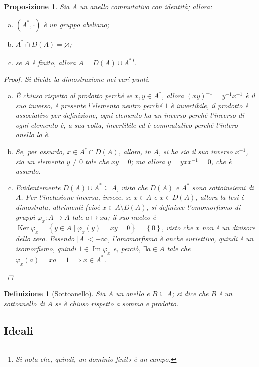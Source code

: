 \documentclass[11pt]{scrartcl}
\theoremstyle{style1}
\newtheorem{prop}{Proposizione}[section]
\newtheorem{definizione}{Definizione}[section]
\numberwithin{equation}{subsection}
\begin{document}
\begin{prop}
	Sia $A $ un anello commutativo con identit\`a; allora:
	\begin{enumerate}[(a).]
		\item $(A^*,\cdot )$ \`e un gruppo abeliano;
		\item $A^* \cap D(A) = \varnothing$;
		\item se $A$ \`e finito, allora $A = D(A) \cup A^*$\footnote{Si nota che, quindi, un dominio finito \`e un campo.}.
	\end{enumerate}
	\begin{proof}Si divide la dimostrazione nei vari punti.
		\begin{enumerate}[(a).]
			\item \`E chiuso rispetto al prodotto perch\'e se $x,y \in A^*$, allora $(xy)^{-1}=y^{-1}x^{-1}$ \`e il suo inverso, \`e presente l'elemento neutro perch\'e $1 $ \`e invertibile, il prodotto \`e associativo per definizione, ogni elemento ha un inverso perch\'e l'inverso di ogni elemento \`e, a sua volta, invertibile ed \`e commutativo perch\'e l'intero anello lo \`e.
			\item Se, per assurdo, $x \in A^* \cap D(A)$, allora, in $A$, si ha sia il suo inverso $x^{-1}$, sia un elemento $y\neq 0$ tale che $xy = 0$; ma allora $y = y x x^{-1} = 0$, che \`e assurdo.
			\item Evidentemente $D(A) \cup A^* \subseteq A$, visto che $D(A)$ e $A^*$ sono sottoinsiemi di $A$.
				Per l'inclusione inversa, invece, se $x \in A$ e $x \in D(A)$, allora la tesi \`e dimostrata, altrimenti (cio\`e $x \in A \setminus D(A)$, si definisce l'omomorfismo di gruppi $\varphi _x : A \to A$ tale $a\longmapsto xa$; il suo nucleo \`e $\operatorname{Ker} \varphi_x  = \left\{ y \in  A  \mid \varphi _x(y) = xy = 0 \right\} = \left\{ 0 \right\} $, visto che $x$ non \`e un divisore dello zero.
				Essendo $|A|<+\infty$, l'omomorfismo \`e anche suriettivo, quindi \`e un isomorfismo, quindi $1 \in \operatorname{Im} \varphi _x$ e, perci\`o, $\exists a \in A$ tale che $\varphi _x (a) = xa = 1\implies x \in A^*$.
		\end{enumerate}
	\end{proof}
\end{prop}
\begin{definizione}
	[Sottoanello]
	Sia $A$ un anello e $B \subseteq A$; si dice che $B$ \`e un \textit{sottoanello} di $A$ se \`e chiuso rispetto a somma e prodotto.
\end{definizione}
\subsection{Ideali}
\end{document}
